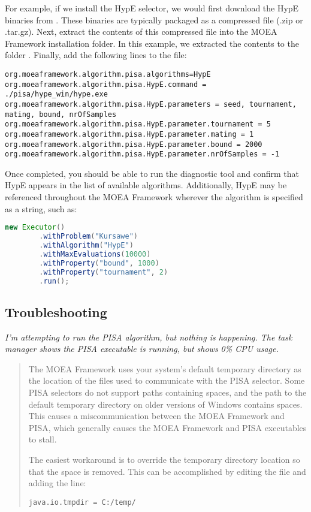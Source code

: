 For example, if we install the HypE selector, we would first download the HypE binaries from .  These binaries are typically packaged as a compressed file (.zip or .tar.gz).  Next, extract the contents of this compressed file into the MOEA Framework installation folder.  In this example, we extracted the contents to the folder .  Finally, add the following lines to the  file:

\begin{lstlisting}[language=Plaintext]
org.moeaframework.algorithm.pisa.algorithms=HypE
org.moeaframework.algorithm.pisa.HypE.command = ./pisa/hype_win/hype.exe
org.moeaframework.algorithm.pisa.HypE.parameters = seed, tournament, mating, bound, nrOfSamples
org.moeaframework.algorithm.pisa.HypE.parameter.tournament = 5
org.moeaframework.algorithm.pisa.HypE.parameter.mating = 1
org.moeaframework.algorithm.pisa.HypE.parameter.bound = 2000
org.moeaframework.algorithm.pisa.HypE.parameter.nrOfSamples = -1
\end{lstlisting}

Once completed, you should be able to run the diagnostic tool and confirm that HypE appears in the list of available algorithms.  Additionally, HypE may be referenced throughout the MOEA Framework wherever the algorithm is specified as a string, such as:

\begin{lstlisting}[language=Java]
new Executor()
		.withProblem("Kursawe")
		.withAlgorithm("HypE")
		.withMaxEvaluations(10000)
		.withProperty("bound", 1000)
		.withProperty("tournament", 2)
		.run();
\end{lstlisting}

\subsection{Troubleshooting}

\noindent
\textit{I'm attempting to run the PISA algorithm, but nothing is happening.  The task manager shows the PISA executable is running, but shows 0\% CPU usage.}

\begin{quote}
The MOEA Framework uses your system's default temporary directory as the location of the files used to communicate with the PISA selector.  Some PISA selectors do not support paths containing spaces, and the path to the default temporary directory on older versions of Windows contains spaces.  This causes a miscommunication between the MOEA Framework and PISA, which generally causes the MOEA Framework and PISA executables to stall.

The easiest workaround is to override the temporary directory location so that the space is removed.  This can be accomplished by editing the  file and adding the line:

\begin{lstlisting}[language=Plaintext]
java.io.tmpdir = C:/temp/
\end{lstlisting}
\end{quote}

